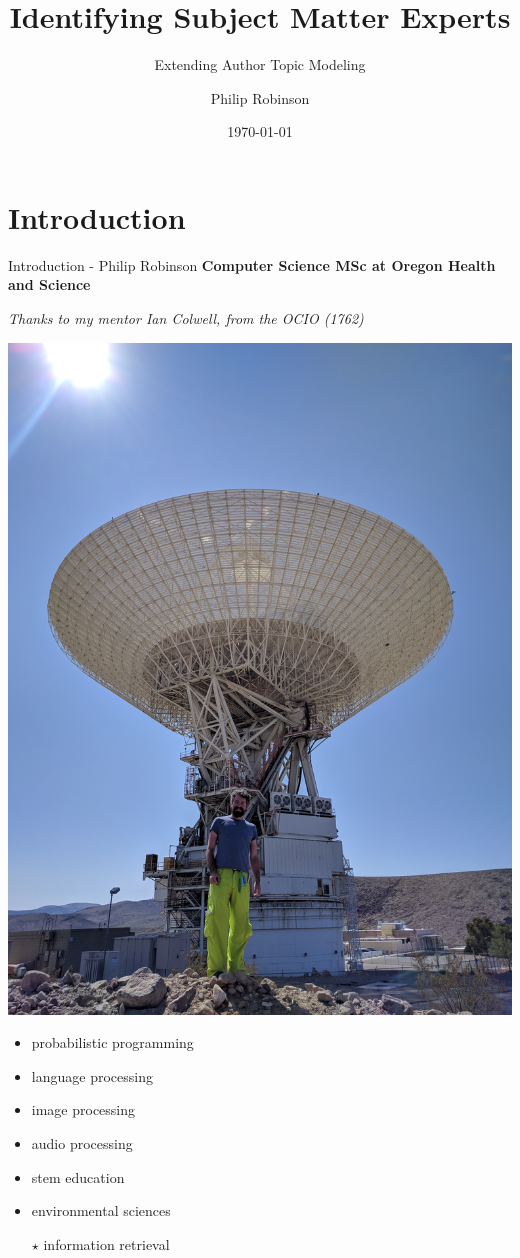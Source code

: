 \documentclass[10pt]{beamer}
\title{Identifying Subject Matter Experts}
\subtitle{Extending Author Topic Modeling}
\author{Philip Robinson}
\date{\today}
\institute{Presented to 5x \\ NASA - Jet Propulsion Lab}
\begin{document}
\begin{frame}
  \titlepage


\end{frame}

\section{Introduction}
\begin{frame}{Introduction - Philip Robinson}
  {\bf Computer Science MSc at Oregon Health and Science}

  \vspace{1em}

  {\em Thanks to my mentor Ian Colwell, from the OCIO (1762)}

  \begin{multicols}{2}
    \includegraphics[width=\columnwidth]{./philip.jpg}

    \begin{itemize}
    \item probabilistic programming
    \item language processing
    \item image processing
    \item audio processing
    \item stem education
    \item environmental sciences
    \item[$\star$] information retrieval
    \end{itemize}

  \end{multicols}

\end{frame}
\end{document}
